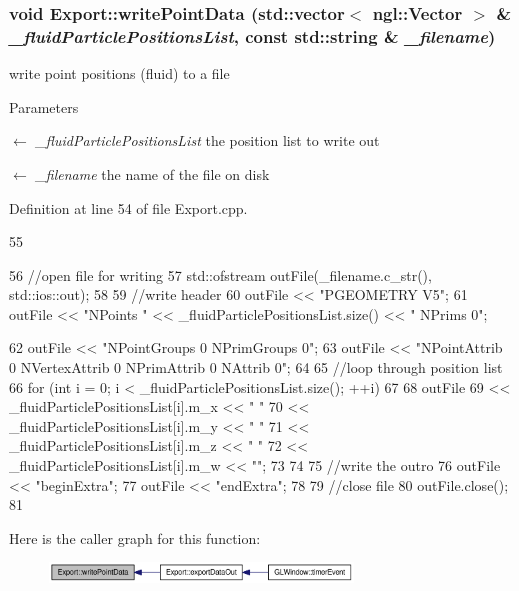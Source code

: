\hypertarget{class_export_ade2f12dbd5ab27d8268aef4233b92964}{
\subsubsection[{writePointData}]{\setlength{\rightskip}{0pt plus 5cm}void Export::writePointData (std::vector$<$ ngl::Vector $>$ \& {\em \_\-fluidParticlePositionsList}, \/  const std::string \& {\em \_\-filename})}}
\label{class_export_ade2f12dbd5ab27d8268aef4233b92964}


write point positions (fluid) to a file 


\begin{DoxyParams}{Parameters}
\item[\mbox{$\leftarrow$} {\em \_\-fluidParticlePositionsList}]the position list to write out \item[\mbox{$\leftarrow$} {\em \_\-filename}]the name of the file on disk \end{DoxyParams}


Definition at line 54 of file Export.cpp.




\begin{DoxyCode}
55 {
56     //open file for writing
57     std::ofstream outFile(_filename.c_str(), std::ios::out);
58 
59     //write header
60     outFile << "PGEOMETRY V5\n";
61     outFile << "NPoints " << _fluidParticlePositionsList.size() << " NPrims 0\n";
      
62     outFile << "NPointGroups 0 NPrimGroups 0\n";
63     outFile << "NPointAttrib 0 NVertexAttrib 0 NPrimAttrib 0 NAttrib 0\n";
64 
65     //loop through position list
66     for (int i = 0; i < _fluidParticlePositionsList.size(); ++i)
67     {
68         outFile
69                 << _fluidParticlePositionsList[i].m_x << " "
70                 << _fluidParticlePositionsList[i].m_y << " "
71                 << _fluidParticlePositionsList[i].m_z << " "
72                 << _fluidParticlePositionsList[i].m_w << "\n";
73     }
74 
75     //write the outro
76     outFile << "beginExtra\n";
77     outFile << "endExtra";
78 
79     //close file
80     outFile.close();
81 }
\end{DoxyCode}




Here is the caller graph for this function:\nopagebreak
\begin{figure}[H]
\begin{center}
\leavevmode
\includegraphics[width=229pt]{class_export_ade2f12dbd5ab27d8268aef4233b92964_icgraph}
\end{center}
\end{figure}




